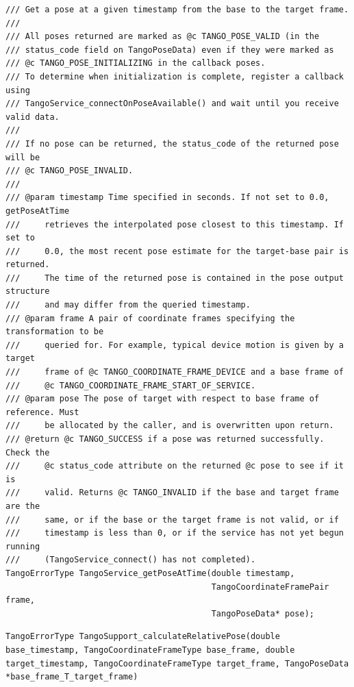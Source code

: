 \documentclass[12pt,twoside]{article}
\begin{document}
                                          
\begin{lstlisting}
/// Get a pose at a given timestamp from the base to the target frame.
///
/// All poses returned are marked as @c TANGO_POSE_VALID (in the
/// status_code field on TangoPoseData) even if they were marked as
/// @c TANGO_POSE_INITIALIZING in the callback poses.
/// To determine when initialization is complete, register a callback using
/// TangoService_connectOnPoseAvailable() and wait until you receive valid data.
///
/// If no pose can be returned, the status_code of the returned pose will be
/// @c TANGO_POSE_INVALID.
///
/// @param timestamp Time specified in seconds. If not set to 0.0, getPoseAtTime
///     retrieves the interpolated pose closest to this timestamp. If set to
///     0.0, the most recent pose estimate for the target-base pair is returned.
///     The time of the returned pose is contained in the pose output structure
///     and may differ from the queried timestamp.
/// @param frame A pair of coordinate frames specifying the transformation to be
///     queried for. For example, typical device motion is given by a target
///     frame of @c TANGO_COORDINATE_FRAME_DEVICE and a base frame of
///     @c TANGO_COORDINATE_FRAME_START_OF_SERVICE.
/// @param pose The pose of target with respect to base frame of reference. Must
///     be allocated by the caller, and is overwritten upon return.
/// @return @c TANGO_SUCCESS if a pose was returned successfully. Check the
///     @c status_code attribute on the returned @c pose to see if it is
///     valid. Returns @c TANGO_INVALID if the base and target frame are the
///     same, or if the base or the target frame is not valid, or if
///     timestamp is less than 0, or if the service has not yet begun running
///     (TangoService_connect() has not completed).
TangoErrorType TangoService_getPoseAtTime(double timestamp,
                                          TangoCoordinateFramePair frame,
                                          TangoPoseData* pose);
\end{lstlisting}


\begin{lstlisting}
TangoErrorType TangoSupport_calculateRelativePose(double base_timestamp, TangoCoordinateFrameType base_frame, double target_timestamp, TangoCoordinateFrameType target_frame, TangoPoseData *base_frame_T_target_frame)
\end{lstlisting}


\begin{lstlisting}
\end{lstlisting}
\end{document}
